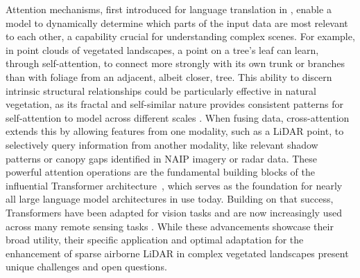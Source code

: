 \documentclass[remotesensing,article,accept,pdftex,moreauthors]{Definitions/mdpi}
\begin{document}
Attention mechanisms, first introduced for language translation in \cite{bahdanau2014neural}, enable a model to dynamically determine which parts of the input data are most relevant to each other, a capability crucial for understanding complex scenes. For example, in point clouds of vegetated landscapes, a point on a tree’s leaf can learn, through self-attention, to connect more strongly with its own trunk or branches than with foliage from an adjacent, albeit closer, tree. This ability to discern intrinsic structural relationships could be particularly effective in natural vegetation, as its fractal and self-similar nature provides consistent patterns for self-attention to model across different scales \cite{scheuring1994application, yang2015extraction}. When fusing data, cross-attention extends this by allowing features from one modality, such as a LiDAR point, to selectively query information from another modality, like relevant shadow patterns or canopy gaps identified in NAIP imagery or radar data. These powerful attention operations are the fundamental building blocks of the influential Transformer architecture~\cite{vaswani2017attention}, which serves as the foundation for nearly all large language model architectures in use today. Building on that success, Transformers have been adapted for vision tasks \cite{dosovitskiy2020image} and are now increasingly used across many remote sensing tasks \cite{aleissaee2023transformers}. While these advancements showcase their broad utility, their specific application and optimal adaptation for the enhancement of sparse airborne LiDAR in complex vegetated landscapes present unique challenges and open questions.
\end{document}

